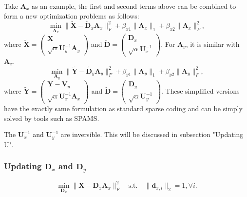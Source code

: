 \documentclass[10pt,twocolumn,letterpaper]{article}
\begin{document}
Take $\mathbf{A}_{x}$ as an example, the first and second terms above can be combined to form a new optimization problems as follows:
\begin{equation}
\min_{\mathbf{A}_{x}}
\|\widetilde{\mathbf{X}}-\widetilde{\mathbf{D}}_{x}\mathbf{A}_{x}\|_{F}^{2}
+
\beta_{x1}\|\mathbf{A}_{x}\|_{1}
+
\beta_{x2}\|\mathbf{A}_{x}\|_{F}^{2},
\end{equation}
where 
$
\widetilde{\mathbf{X}}
=
\left(\begin{array}{c}
\mathbf{X}
\\
\sqrt{\alpha}\mathbf{U}_{y}^{-1}\mathbf{A}_{y}
\end{array}\right)
$
and
$
\widetilde{\mathbf{D}}
=
\left(\begin{array}{c}
\mathbf{D}_{x}
\\
\sqrt{\alpha}\mathbf{U}_{x}^{-1}
\end{array}\right)
$.
For $\mathbf{A}_{y}$, it is similar with $\mathbf{A}_{x}$.
\begin{equation}
\min_{\mathbf{A}_{y}}
\|\widetilde{\mathbf{Y}}-\widetilde{\mathbf{D}}_{y}\mathbf{A}_{y}\|_{F}^{2}
+
\beta_{y1}\|\mathbf{A}_{y}\|_{1}
+
\beta_{y2}\|\mathbf{A}_{y}\|_{F}^{2},
\end{equation}
where 
$
\widetilde{\mathbf{Y}}
=
\left(\begin{array}{c}
\mathbf{Y}-\mathbf{V}_{y}
\\
\sqrt{\alpha}\mathbf{U}_{x}^{-1}\mathbf{A}_{x}
\end{array}\right)
$
and
$
\widetilde{\mathbf{D}}
=
\left(\begin{array}{c}
\mathbf{D}_{y}
\\
\sqrt{\alpha}\mathbf{U}_{y}^{-1}
\end{array}\right)
$.
These simplified versions have the exactly same formulation as standard sparse coding and can be simply solved by tools such as SPAMS.

The $\mathbf{U}_{x}^{-1}$ and $\mathbf{U}_{y}^{-1}$ are inversible. This will be discussed in subsection "Updating U".

\subsubsection{Updating $\mathbf{D}_{x}$ and $\mathbf{D}_{y}$}
\begin{equation}
\min_{\mathbf{D}_{x}}
\|\mathbf{X}-\mathbf{D}_{x}\mathbf{A}_{x}\|_{F}^{2}
\quad
\text{s.t.}
\quad
\|\mathbf{d}_{x,i}\|_{2}=1,
\forall{i}.
\end{equation}
\end{document}
